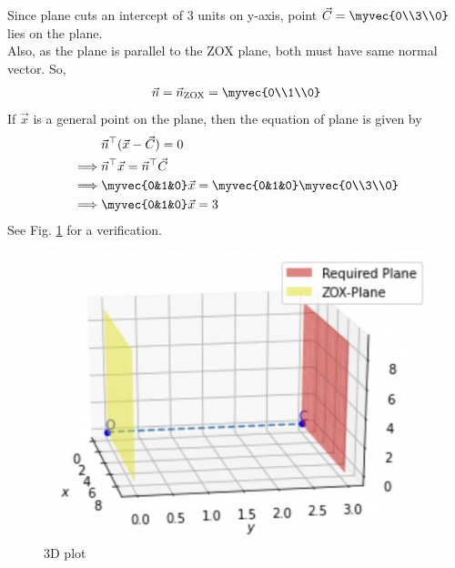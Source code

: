
Since plane cuts an intercept of 3 units on y-axis, point $\vec{C}=\myvec{0\\3\\0}$ lies on the plane.\\
Also, as the plane is parallel to the ZOX plane, both must have same normal vector. So,
\begin{align}
    \vec{n}=\vec{n}_{\text{ZOX}}=\myvec{0\\1\\0}
\end{align}
If $\vec{x}$ is a general point on the plane, then the equation of plane is given by
\begin{align}
    &\vec{n}^\top(\vec{x}-\vec{C})=0\\
    \implies &\vec{n}^\top\vec{x}=\vec{n}^\top\vec{C}\\
    \implies &\myvec{0&1&0}\vec{x}=\myvec{0&1&0}\myvec{0\\3\\0}\\
    \implies &\myvec{0&1&0}\vec{x}=3
\end{align}
See Fig.          \ref{aug/2/26/plot} for a verification.
\begin{figure}[!ht]
\centering
         \includegraphics[width=\columnwidth]{solutions/aug/2/26/figures/figure.png}
         \caption{3D plot}
         \label{aug/2/26/plot}
\end{figure}

